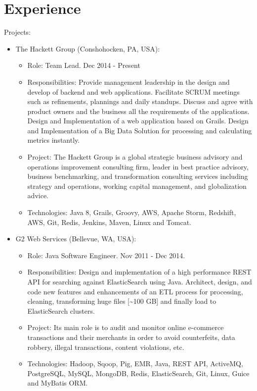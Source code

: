 \documentclass[11pt,a4paper,sans]{moderncv}        %
\begin{document}
\section{Experience}
  {
    Projects:\\
    \begin{itemize}
      \item The Hackett Group (Conshohocken, PA, USA):
        \begin{itemize}
          \item Role: Team Lead. Dec 2014 - Present
          \item Responsibilities: Provide management leadership in the design and develop of backend and web applications. Facilitate SCRUM meetings such as refinements, plannings and daily standups.
		Discuss and agree with product owners and the business all the requirements of the applications. Design and Implementation of a web application based on Grails.
		Design and Implementation of a Big Data Solution for processing and calculating metrics instantly.
          \item Project: The Hackett Group is a global strategic business advisory and operations improvement consulting firm, leader in best practice advisory, business benchmarking, 
                and transformation consulting services including strategy and operations, working capital management, and globalization advice.
          \item Technologies: Java 8, Grails, Groovy, AWS, Apache Storm, Redshift, AWS, Git, Redis, Jenkins, Maven, Linux and Tomcat.
        \end{itemize}
      \item G2 Web Services (Bellevue, WA, USA):
        \begin{itemize}
          \item Role: Java Software Engineer. Nov 2011 - Dec 2014.
          \item Responsibilities: Design and implementation of a high performance REST API for searching against ElasticSearch using Java.
                Architect, design, and code new features and enhancements of an ETL process for processing, cleaning, transforming huge files [\textasciitilde{}100 GB] and finally load to ElasticSearch clusters. 
          \item Project: Its main role is to audit and monitor online e-commerce transactions and their merchants in order to avoid counterfeits, data robbery, illegal transactions, content violations, etc.
          \item Technologies: Hadoop, Sqoop, Pig, EMR, Java, REST API, ActiveMQ, PostgreSQL, MySQL, MongoDB, Redis, ElasticSearch, Git, Linux, Guice and MyBatis ORM.
        \end{itemize}
    \end{itemize}
  }
\end{document}
